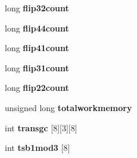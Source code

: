 \begin{DoxyCompactItemize}
long {\bfseries flip32count}
\item 
\mbox{\label{classtetgenmesh_a84660f45542f2f8c6609fceb8ad00615}} 
long {\bfseries flip44count}
\item 
\mbox{\label{classtetgenmesh_accf2261a6d043618bfbb7af3368eae51}} 
long {\bfseries flip41count}
\item 
\mbox{\label{classtetgenmesh_a1970580330b0ef8b71a6afb16a255a50}} 
long {\bfseries flip31count}
\item 
\mbox{\label{classtetgenmesh_a3d8ebbb8bbacdd0d1cfc899cf40caab3}} 
long {\bfseries flip22count}
\item 
\mbox{\label{classtetgenmesh_a67341ca5f2c0ece12052d62316f99363}} 
unsigned long {\bfseries totalworkmemory}
\item 
\mbox{\label{classtetgenmesh_a606af36503a05864a66eed7887031f92}} 
int {\bfseries transgc} \mbox{[}8\mbox{]}\mbox{[}3\mbox{]}\mbox{[}8\mbox{]}
\item 
\mbox{\label{classtetgenmesh_abcdcec3f841610fe91a0160b4e3a838e}} 
int {\bfseries tsb1mod3} \mbox{[}8\mbox{]}
\end{DoxyCompactItemize}
